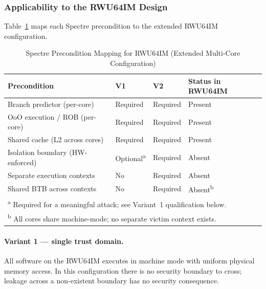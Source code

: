 \subsubsection{Applicability to the RWU64IM Design}

Table~\ref{tab:spectre_precond} maps each Spectre precondition to the extended
RWU64IM configuration.

\begin{table}[h]
  \centering
  \caption{Spectre Precondition Mapping for RWU64IM (Extended Multi-Core Configuration)}
  \label{tab:spectre_precond}
  \begin{tabular}{llll}
    \hline
    \textbf{Precondition}            & \textbf{V1}                 & \textbf{V2} & \textbf{Status in RWU64IM}    \\
    \hline
    Branch predictor (per-core)      & Required                    & Required    & Present                       \\
    OoO execution / ROB (per-core)   & Required                    & Required    & Present                       \\
    Shared cache (L2 across cores)   & Required                    & Required    & Present                       \\
    Isolation boundary (HW-enforced) & Optional\textsuperscript{a} & Required    & Absent                        \\
    Separate execution contexts      & No                          & Required    & Absent                        \\
    Shared BTB across contexts       & No                          & Required    & Absent\textsuperscript{b}     \\
    \hline
    \multicolumn{4}{l}{\textsuperscript{a} Required for a meaningful attack; see Variant~1 qualification below.} \\
    \multicolumn{4}{l}{\textsuperscript{b} All cores share machine-mode; no separate victim context exists.}     \\
  \end{tabular}
\end{table}

\paragraph{Variant 1 — single trust domain.}
All software on the RWU64IM executes in machine mode with uniform physical
memory access. In this configuration there is no security boundary to cross;
leakage across a non-existent boundary has no security consequence.

